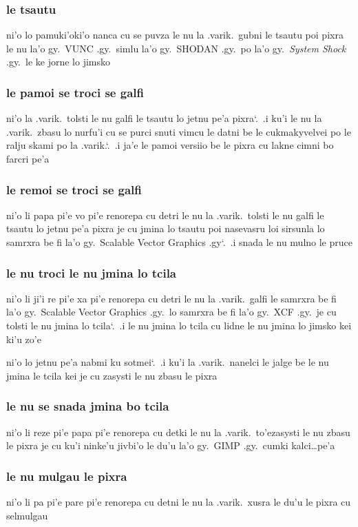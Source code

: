 \documentclass{report}
\newcommand\sds{\spacefactor\sfcode`.\ \space}
\begin{document}
\subsubsection{le tsautu}
ni'o lo pamuki'oki'o nanca cu se puvza le nu la .varik.\ gubni le tsautu poi pixra le nu la'o gy.\ VUNC .gy.\ simlu la'o gy.\ SHODAN .gy.\ po la'o gy.\ \textit{System Shock} .gy.\ le ke jorne lo jimsko

\subsubsection{le pamoi se troci se galfi}
ni'o la .varik.\ tolsti le nu galfi le tsautu lo jetnu pe'a pixra\sds  .i ku'i le nu la .varik.\ zbasu lo nurfu'i cu se purci snuti vimcu le datni be le cukmakyvelvei po le ralju skami po la .varik.\sds  .i ja'e le pamoi versiio be le pixra cu lakne cimni bo farcri pe'a

\subsubsection{le remoi se troci se galfi}
ni'o li papa pi'e vo pi'e renorepa cu detri le nu la .varik.\ tolsti le nu galfi le tsautu lo jetnu pe'a pixra je cu jmina lo tsautu poi nasevasru loi sirsunla lo samrxra be fi la'o gy.\ Scalable Vector Graphics .gy\sds  .i snada le nu mulno le pruce

\subsubsection{le nu troci le nu jmina lo tcila}
ni'o li ji'i re pi'e xa pi'e renorepa cu detri le nu la .varik.\ galfi le samrxra be fi la'o gy.\ Scalable Vector Graphics .gy.\ lo samrxra be fi la'o gy.\ XCF .gy.\ je cu tolsti le nu jmina lo tcila\sds  .i le nu jmina lo tcila cu lidne le nu jmina lo jimsko kei ki'u zo'e

ni'o lo jetnu pe'a nabmi ku sotmei\sds  .i ku'i la .varik.\ nanelci le jalge be le nu jmina le tcila kei je cu zasysti le nu zbasu le pixra

\subsubsection{le nu se snada jmina bo tcila}
ni'o li reze pi'e papa pi'e renorepa cu detki le nu la .varik.\ to'ezasysti le nu zbasu le pixra je cu ku'i ninke'u jivbi'o le du'u la'o gy.\ GIMP .gy.\ cumki kalci\ldots pe'a

\subsubsection{le nu mulgau le pixra}
ni'o li pa pi'e pare pi'e renorepa cu detni le nu la .varik.\ xusra le du'u le pixra cu selmulgau
\end{document}
